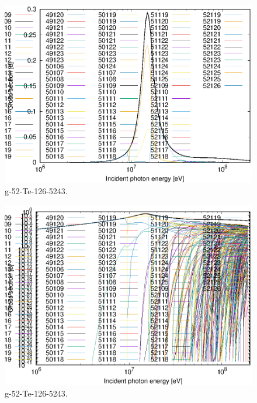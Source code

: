\begin{figure}
 \includegraphics[width=\linewidth]{eps/g_52-Te-126_5243.eps}
  \caption{g-52-Te-126-5243.}
\end{figure}
\begin{figure}
 \includegraphics[width=\linewidth]{eps-log/g_52-Te-126_5243.eps}
 \caption{g-52-Te-126-5243.}
\end{figure}
\newpage \clearpage

